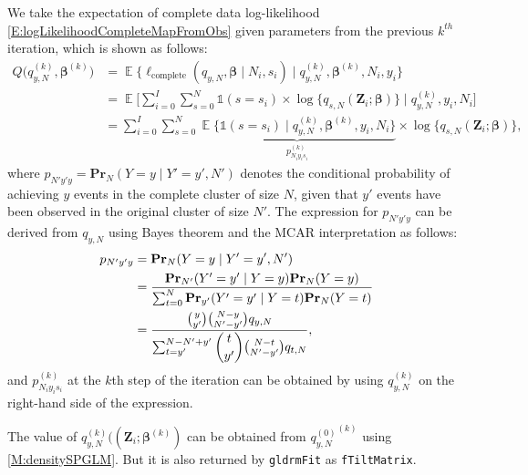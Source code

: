 \documentclass[reqno]{amsart}
\DeclareMathOperator{\E}{\mathbb{E}}
\begin{document}
We take the expectation of complete data log-likelihood \eqref{E:logLikelihoodCompleteMapFromObs} given parameters from the previous $k^{th}$ iteration, which is shown as follows:
\begin{equation}\label{E:ExpectedlogLikelihoodCompleteMapFromObs}
\begin{split}
    Q \bigg( q_{y,N}^{(k)}, \boldsymbol{\beta}^{(k)} \bigg) &= 
     \E \bigg\{ \ell_{\text{complete}} (q_{y,N}, \boldsymbol{\beta} \mid N_i, s_i) \mid q_{y,N}^{(k)}, \boldsymbol{\beta}^{(k)}, N_i, y_i \bigg\} \\
    &= \E \Bigg[ \sum_{i=0}^I \sum_{s=0}^N {\mathds{1}}(s=s_i) \times \log \{ q_{s,N}(\boldsymbol{Z}_i; \boldsymbol{\beta}) \} \mid q_{y,N}^{(k)}, y_i,N_i \Bigg] \\
    &= \sum_{i=0}^I \sum_{s=0}^N \underbrace{ \E \big\{ {\mathds{1}}(s=s_i) \mid q_{y,N}^{(k)}, \boldsymbol{\beta}^{(k)}, y_i, N_i \big\}}_{p_{N_iy_is_i}^{(k)}} \times \log \{q_{s,N}(\boldsymbol{Z}_i; \boldsymbol{\beta}) \},
\end{split}
\end{equation}
where $p_{N'y'y} = \textbf{Pr}_N(Y=y \mid Y'=y',N')$ denotes the conditional probability of achieving $y$ events in the complete cluster of size $N$, given that $y'$ events have been observed in the original cluster of size $N'$. 
The expression for $p_{N'y'y}$ can be derived from $q_{y,N}$ using Bayes theorem and the MCAR interpretation as follows:
\begin{equation}\label{D:prst}
\begin{split}
p_{N'y'y} &= \textbf{Pr}_N(Y=y \mid Y'=y',N') \\ 
          &= \frac{\textbf{Pr}_{N'}(Y'=y' \mid Y=y) \textbf{Pr}_N(Y=y)}{\sum_{t=0}^{N} \textbf{Pr}_{y'}(Y'=y' \mid Y=t) \textbf{Pr}_N(Y=t)} \\ 
          &= \frac{\binom{y}{y'} \binom{N-y}{N'-y'} q_{y,N}}{\sum_{t=y'}^{N-N'+y'} \dbinom{t}{y'} \binom{N-t}{N'-y'} q_{t,N}},
\end{split}
\end{equation}
and $p_{N_iy_is_i}^{(k)}$ at the $k$th step of the iteration can be obtained by using $q_{y,N}^{(k)}$ on the right-hand side of the expression. 

The value of $q_{y,N}^{(k)}((\boldsymbol{Z}_i; \boldsymbol{\beta}^{(k)})$ can be obtained from ${q_{y,N}^{(0)}}^{(k)}$ using \ref{M:densitySPGLM}. But it is also returned by \texttt{gldrmFit} as \texttt{fTiltMatrix}.
\end{document}
